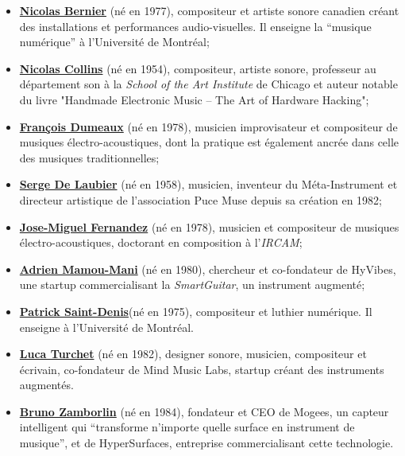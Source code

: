 \vspace{-1em}
\begin{itemize}[noitemsep]
\item \textbf{\hyperref[appendix:bernier]{Nicolas Bernier}} (né en 1977), compositeur et artiste sonore canadien créant des installations et performances audio-visuelles. Il enseigne la ``musique numérique'' à l'Université de Montréal;
\item \textbf{\hyperref[appendix:collins]{Nicolas Collins}} (né en 1954), compositeur, artiste sonore, professeur au département son à la \textit{School of the Art Institute} de Chicago et auteur notable du livre "Handmade Electronic Music – The Art of Hardware Hacking";
\item \textbf{\hyperref[appendix:dumeaux]{François Dumeaux}} (né en 1978), musicien improvisateur  et compositeur de musiques électro-acoustiques, dont la pratique est également ancrée dans celle des musiques traditionnelles;
\item \textbf{\hyperref[appendix:delaubier]{Serge De Laubier}} (né en 1958), musicien, inventeur du Méta-Instrument et directeur artistique de l'association Puce Muse depuis sa création en 1982;
\item \textbf{\hyperref[appendix:fernandez]{Jose-Miguel Fernandez}} (né en 1978), musicien et compositeur de musiques électro-acoustiques, doctorant en composition à l'\textit{IRCAM};
\item \textbf{\hyperref[appendix:mamou-mani]{Adrien Mamou-Mani}} (né en 1980), chercheur et co-fondateur de HyVibes, une startup commercialisant la \textit{SmartGuitar}, un instrument augmenté;
\item \textbf{\hyperref[appendix:saint-denis]{Patrick Saint-Denis}}(né en 1975), compositeur et luthier numérique. Il enseigne à l'Université de Montréal.
\item \textbf{\hyperref[appendix:turchet]{Luca Turchet}} (né en 1982), designer sonore, musicien, compositeur et écrivain, co-fondateur de Mind Music Labs, startup créant des instruments augmentés.
\item \textbf{\hyperref[appendix:zamborlin]{Bruno Zamborlin}} (né en 1984), fondateur et CEO de Mogees, un capteur intelligent qui ``transforme n'importe quelle surface en instrument de musique'', et de HyperSurfaces, entreprise commercialisant cette technologie. 
\end{itemize}

